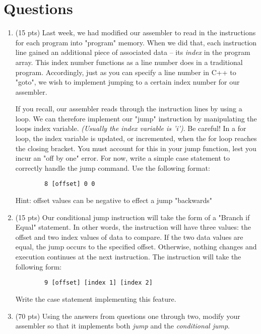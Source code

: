 \documentclass[letterpaper,12pt]{article}
\begin{document}
\section*{Questions}
\begin{enumerate}
    \item (15 pts) Last week, we had modified our assembler to read in the instructions for each program
        into "program" memory. When we did that, each instruction line gained an additional piece of
        associated data -- its \emph{index} in the program array. This index number functions as a line
        number does in a traditional program. Accordingly, just as you can specify a line number in C++ 
        to "goto", we wish to implement jumping to a certain index number for our assembler.

        If you recall, our assembler reads through the instruction lines by using a loop. We can
        therefore implement our "jump" instruction by manipulating the loops index variable.
        \emph{(Usually the index variable is 'i')}. Be careful! In a for loop, the index variable is updated,
        or incremented, when the for loop reaches the closing bracket. You must account for this in your
        jump function, lest you incur an "off by one" error. For now, write a simple case statement to
        correctly handle the jump command. Use the following format:
        \begin{lstlisting}
        8 [offset] 0 0
        \end{lstlisting}
        Hint: offset values can be negative to effect a jump "backwards"
    \vspace{30mm}
    \item (15 pts) Our conditional jump instruction will take the form of a "Branch if Equal"
        statement. In other words, the instruction will have three values: the offset and two index values
        of data to compare. If the two data values are equal, the jump occurs to the specified offset. Otherwise,
        nothing changes and execution continues at the next instruction. The instruction will take the following
        form:
        \begin{lstlisting}
        9 [offset] [index 1] [index 2]
        \end{lstlisting}
        Write the case statement implementing this feature.
    \vspace{40mm}
\item (70 pts) Using the answers from questions one through two, modify your
    assembler so that it implements both \emph{jump} and the \emph{conditional jump}.

\end{enumerate}
\end{document}
